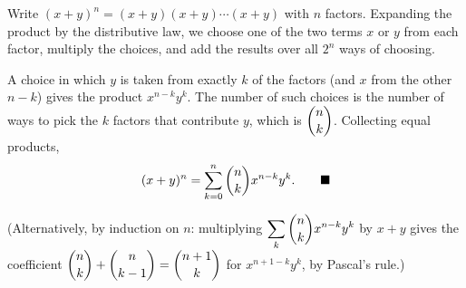 Write $(x+y)^n=(x+y)(x+y)\cdots(x+y)$ with $n$ factors. Expanding the product by the distributive law, we choose one of the two terms $x$ or $y$ from each factor, multiply the choices, and add the results over all $2^n$ ways of choosing.

A choice in which $y$ is taken from exactly $k$ of the factors (and $x$ from the other $n-k$) gives the product $x^{n-k}y^k$. The number of such choices is the number of ways to pick the $k$ factors that contribute $y$, which is $\dbinom nk$. Collecting equal products,
\[(x+y)^n=\sum_{k=0}^{n}\dbinom nk x^{n-k}y^k.\qquad\blacksquare\]

(Alternatively, by induction on $n$: multiplying $\displaystyle\sum_k\dbinom{n}{k}x^{n-k}y^k$ by $x+y$ gives the coefficient $\dbinom nk+\dbinom n{k-1}=\dbinom{n+1}{k}$ for $x^{n+1-k}y^k$, by Pascal's rule.)
